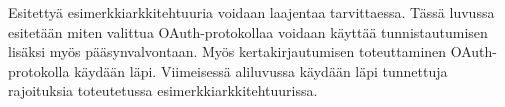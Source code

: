Esitettyä esimerkkiarkkitehtuuria voidaan laajentaa tarvittaessa. Tässä luvussa esitetään miten valittua OAuth-protokollaa voidaan käyttää tunnistautumisen lisäksi myös pääsynvalvontaan. Myös kertakirjautumisen toteuttaminen OAuth-protokolla käydään läpi. Viimeisessä aliluvussa käydään läpi tunnettuja rajoituksia toteutetussa esimerkkiarkkitehtuurissa.